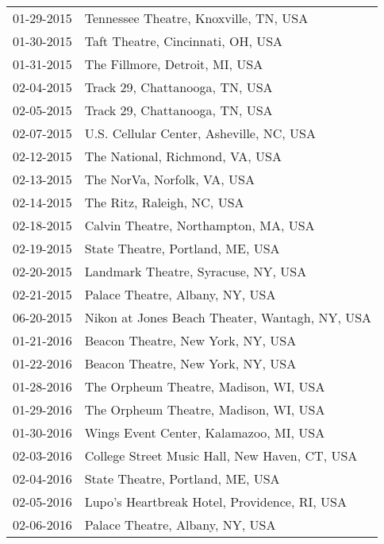 \begin{supertabular}{ll}
 01-29-2015 &                     Tennessee Theatre, Knoxville, TN, USA \\
 01-30-2015 &                         Taft Theatre, Cincinnati, OH, USA \\
 01-31-2015 &                            The Fillmore, Detroit, MI, USA \\
 02-04-2015 &                            Track 29, Chattanooga, TN, USA \\
 02-05-2015 &                            Track 29, Chattanooga, TN, USA \\
 02-07-2015 &                  U.S. Cellular Center, Asheville, NC, USA \\
 02-12-2015 &                           The National, Richmond, VA, USA \\
 02-13-2015 &                               The NorVa, Norfolk, VA, USA \\
 02-14-2015 &                                The Ritz, Raleigh, NC, USA \\
 02-18-2015 &                      Calvin Theatre, Northampton, MA, USA \\
 02-19-2015 &                          State Theatre, Portland, ME, USA \\
 02-20-2015 &                       Landmark Theatre, Syracuse, NY, USA \\
 02-21-2015 &                           Palace Theatre, Albany, NY, USA \\
 06-20-2015 &            Nikon at Jones Beach Theater, Wantagh, NY, USA \\
 01-21-2016 &                         Beacon Theatre, New York, NY, USA \\
 01-22-2016 &                         Beacon Theatre, New York, NY, USA \\
 01-28-2016 &                     The Orpheum Theatre, Madison, WI, USA \\
 01-29-2016 &                     The Orpheum Theatre, Madison, WI, USA \\
 01-30-2016 &                    Wings Event Center, Kalamazoo, MI, USA \\
 02-03-2016 &             College Street Music Hall, New Haven, CT, USA \\
 02-04-2016 &                          State Theatre, Portland, ME, USA \\
 02-05-2016 &              Lupo's Heartbreak Hotel, Providence, RI, USA \\
 02-06-2016 &                           Palace Theatre, Albany, NY, USA \\

\end{supertabular}
